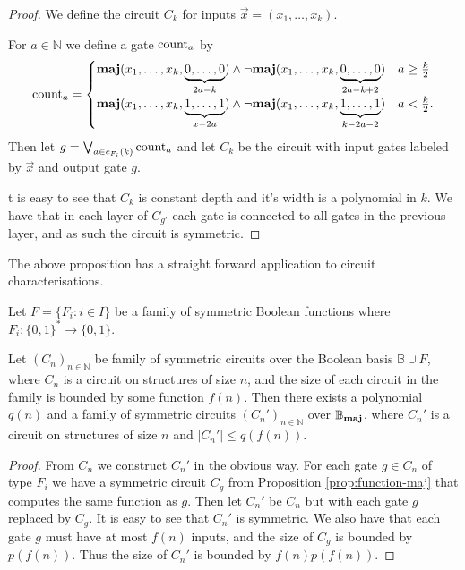 \documentclass[../paper.tex]{subfiles}
\begin{document}
\begin{proof}
  We define the circuit $C_k$ for inputs $\vec{x} = ( x_1, \ldots, x_k )$.

  For $a \in \mathbb{N}$ we define a gate $\text{count}_a$ by
  \begin{align*}
    \text{count}_a = \begin{cases} \text{\textbf{maj}} (x_1, \ldots, x_k, \underbrace {0, \ldots,
        0}_{2a - k}) \land \neg \text{\textbf{maj}} (x_1, \ldots , x_k, \underbrace{0, \ldots,
        0}_{2a - k + 2}) &  a \geq \frac{k}{2} \\
      \text{\textbf{maj}} (x_1, \ldots, x_k, \underbrace {1, \ldots, 1}_{x - 2a}) \land \neg
      \text{\textbf{maj}} (x_1, \ldots , x_k, \underbrace{1, \ldots, 1}_{k - 2a -2}) & a <
      \frac{k}{2}.
    \end{cases}
  \end{align*}
  Then let $g = \bigvee_{a \in c_{F_i}(k)}\text{count}_a$ and let $C_{k}$ be the
  circuit with input gates labeled by $\vec{x}$ and output gate $g$.

  t is easy to see that $C_k$ is constant depth and it's width is a polynomial
  in $k$. We have that in each layer of $C_{g'}$ each gate is connected to all
  gates in the previous layer, and as such the circuit is symmetric.
\end{proof}

The above proposition has a straight forward application to circuit
characterisations.

\begin{thm}
  Let $F = \{F_i : i \in I \}$ be a family of symmetric Boolean functions where
  $F_i: \{0,1\}^* \rightarrow \{ 0,1 \}$.

  Let $(C_n)_{n \in \mathbb{N}}$ be family of symmetric circuits over the
  Boolean basis $\mathbb{B} \cup F$, where $C_n$ is a circuit on structures of
  size $n$, and the size of each circuit in the family is bounded by some
  function $f(n)$. Then there exists a polynomial $q(n)$ and a family of
  symmetric circuits $(C_n')_{n \in \mathbb{N}}$ over $\mathbb{B}_{\text{\textbf{maj}}}$, where
  $C_n'$ is a circuit on structures of size $n$ and $\vert C_n' \vert \leq
  q(f(n))$.
\end{thm}

\begin{proof}
  From $C_n$ we construct $C_n'$ in the obvious way. For each gate $g \in C_n$
  of type $F_i$ we have a symmetric circuit $C_g$ from Proposition
  \ref{prop:function-maj} that computes the same function as $g$. Then let
  $C_n'$ be $C_n$ but with each gate $g$ replaced by $C_g$. It is easy to see
  that $C_n'$ is symmetric. We also have that each gate $g$ must have at most
  $f(n)$ inputs, and the size of $C_g$ is bounded by $p(f(n))$. Thus the size of
  $C_n'$ is bounded by $f(n)p(f(n))$.
\end{proof}
\end{document}
